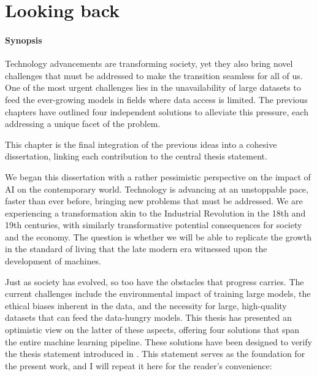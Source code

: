 \graphicspath{{ch7_discussion/}{Figures/}}

\chapter{Looking back}
\label{chapter:discussion}




\subsubsection{Synopsis} Technology advancements are transforming society, yet they also bring novel challenges that must be addressed to make the transition seamless for all of us. One of the most urgent challenges lies in the unavailability of large datasets to feed the ever-growing models in fields where data access is limited. The previous chapters have outlined four independent solutions to alleviate this pressure, each addressing a unique facet of the problem.

This chapter is the final integration of the previous ideas into a cohesive dissertation, linking each contribution to the central thesis statement. 

\sectionlinenew

We began this dissertation with a rather pessimistic perspective on the impact of AI on the contemporary world. Technology is advancing at an unstoppable pace, faster than ever before, bringing new problems that must be addressed. We are experiencing a transformation akin to the Industrial Revolution in the 18th and 19th centuries, with similarly transformative potential consequences for society and the economy. The question is whether we will be able to replicate the growth in the standard of living that the late modern era witnessed upon the development of machines.

Just as society has evolved, so too have the obstacles that progress carries. The current challenges include the environmental impact of training large models, the ethical biases inherent in the data, and the necessity for large, high-quality datasets that can feed the data-hungry models. This thesis has presented an optimistic view on the latter of these aspects, offering four solutions that span the entire machine learning pipeline. These solutions have been designed to verify the thesis statement introduced in . This statement serves as the foundation for the present work, and I will repeat it here for the reader's convenience:
\\

